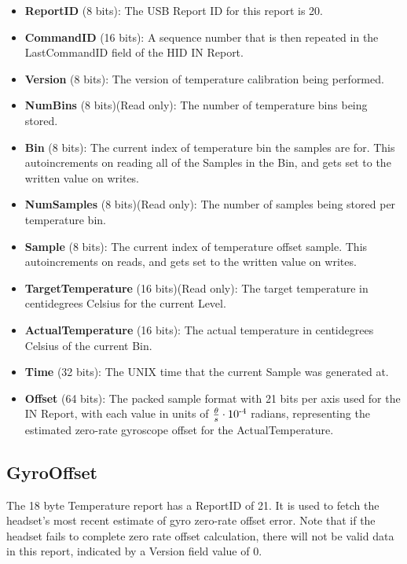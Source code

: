 \documentclass[letterpaper]{article}
\begin{document}
\begin{itemize}
  \item {\bfseries ReportID} (8 bits): The USB Report ID for this report is 20.
  \item {\bfseries CommandID} (16 bits): A sequence number that is then repeated in the LastCommandID field of the HID IN Report.
  \item {\bfseries Version} (8 bits):  The version of temperature calibration being performed.
  \item {\bfseries NumBins} (8 bits)(Read only): The number of temperature bins being stored.
  \item {\bfseries Bin} (8 bits): The current index of temperature bin the samples are for.  This autoincrements on reading all of the Samples in the Bin, and gets set to the written value on writes.
  \item {\bfseries NumSamples} (8 bits)(Read only): The number of samples being stored per temperature bin.
  \item {\bfseries Sample} (8 bits): The current index of temperature offset sample.  This autoincrements on reads, and gets set to the written value on writes.
  \item {\bfseries TargetTemperature} (16 bits)(Read only): The target temperature in centidegrees Celsius for the current Level.
  \item {\bfseries ActualTemperature} (16 bits): The actual temperature in centidegrees Celsius of the current Bin.
  \item {\bfseries Time} (32 bits): The UNIX time that the current Sample was generated at.
  \item {\bfseries Offset} (64 bits): The packed sample format with 21 bits per axis used for the IN Report, with each value in units of $\frac{\theta}{s}\cdot 10\textsuperscript{-4}$ radians, representing the estimated zero-rate gyroscope offset for the ActualTemperature.
\end{itemize}

\newpage

\subsection{GyroOffset}

The 18 byte Temperature report has a ReportID of 21.  It is used to fetch the headset's most recent estimate of gyro zero-rate offset error.  Note that if the headset fails to complete zero rate offset calculation, there will not be valid data in this report, indicated by a Version field value of 0.\\
\end{document}
